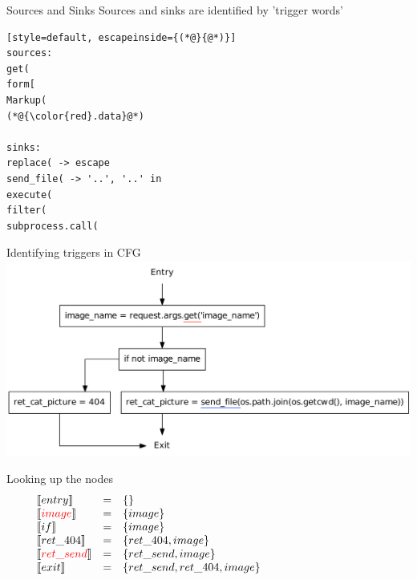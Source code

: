 \begin{frame}
\end{frame}

\begin{frame}[fragile]{Sources and Sinks}
  Sources and sinks are identified by 'trigger words'
  \begin{lstlisting}[style=default, escapeinside={(*@}{@*)}]
sources:
get(
form[
Markup(
(*@{\color{red}.data}@*)

sinks:
replace( -> escape
send_file( -> '..', '..' in
execute(
filter(
subprocess.call(
\end{lstlisting}

\end{frame}

\begin{frame}{Identifying triggers in CFG}
  \includegraphics[width=1.05\textwidth]{graphics/cfg_path_traversal_triggers}
\end{frame}

\begin{frame}{Looking up the nodes}
\[
\begin{array}{lclcl}
  \constraint{entry} & = & \{\} &&\\
  \assignconstraint{image} & = & \{image\} &&\\
  \constraint{if} & = & \{image\} &&\\
  \constraint{ret\_404} & = & \{ret\_404, image\} &&\\
  \assignconstraint{ret\_send} & = & \{ret\_send, image\} &&\\
  \constraint{exit} & = & \{ret\_send, ret\_404, image\} &&\\
  && \phantom{\{command, param\}} && \phantom{\{command, param\}}
\end{array}
\]
\end{frame}
